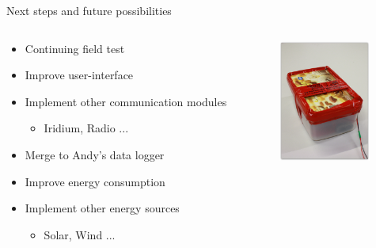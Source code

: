 \documentclass{beamer}
\begin{document}
\begin{frame}{Next steps and future possibilities}
\begin{columns}[T]
	\begin{column}[T]{7cm}
		\begin{itemize}
		\item Continuing field test
		\item Improve user-interface
		\item Implement other communication modules
			\begin{itemize}
			\item Iridium, Radio ...
			\end{itemize}
		\item Merge to Andy's data logger
		\item Improve energy consumption
		\item Implement other energy sources 
			\begin{itemize}
			\item Solar, Wind ...
			\end{itemize}
		\end{itemize}
	\end{column}
	\begin{column}[T]{4cm}
	\includegraphics[height=4cm]{graphics/Field_pictures/Power.jpg}
	\end{column}
\end{columns}
\end{frame}
\end{document}
